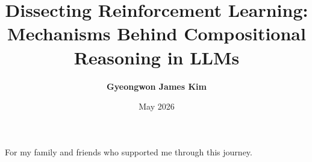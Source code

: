 \documentclass[12pt]{cmuthesis}
\begin{document}
 
\frontmatter

\pagestyle{empty}

\title{ %
{\bf Dissecting Reinforcement Learning: Mechanisms Behind Compositional Reasoning in LLMs}}
\author{\bf Gyeongwon James Kim}
\date{May 2026}


\support{}
\disclaimer{}



\maketitle

\begin{dedication}
For my family and friends who supported me through this journey.
\end{dedication}

\pagestyle{plain} %

\end{document}
